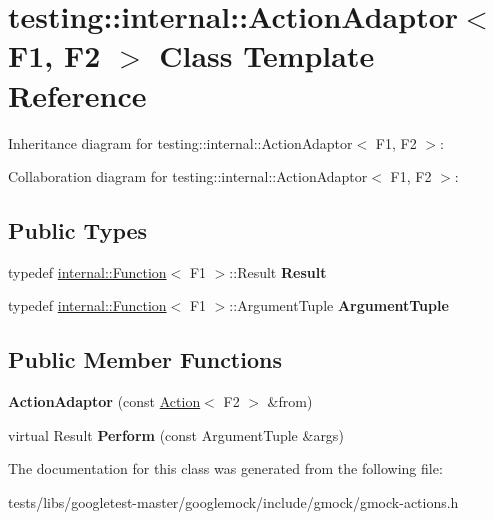 \hypertarget{classtesting_1_1internal_1_1ActionAdaptor}{}\section{testing\+:\+:internal\+:\+:Action\+Adaptor$<$ F1, F2 $>$ Class Template Reference}
\label{classtesting_1_1internal_1_1ActionAdaptor}


Inheritance diagram for testing\+:\+:internal\+:\+:Action\+Adaptor$<$ F1, F2 $>$\+:


Collaboration diagram for testing\+:\+:internal\+:\+:Action\+Adaptor$<$ F1, F2 $>$\+:
\subsection*{Public Types}
\begin{DoxyCompactItemize}
\item 
\mbox{\label{classtesting_1_1internal_1_1ActionAdaptor_afa8f7872b6db3d8f1545fd98b45b0b95}} 
typedef \hyperlink{structtesting_1_1internal_1_1Function}{internal\+::\+Function}$<$ F1 $>$\+::Result {\bfseries Result}
\item 
\mbox{\label{classtesting_1_1internal_1_1ActionAdaptor_a4f78fb73f97b72fea8a93b78a8ab5704}} 
typedef \hyperlink{structtesting_1_1internal_1_1Function}{internal\+::\+Function}$<$ F1 $>$\+::Argument\+Tuple {\bfseries Argument\+Tuple}
\end{DoxyCompactItemize}
\subsection*{Public Member Functions}
\begin{DoxyCompactItemize}
\item 
\mbox{\label{classtesting_1_1internal_1_1ActionAdaptor_a24ba3330ef3cc365b956c50ec73e4177}} 
{\bfseries Action\+Adaptor} (const \hyperlink{classtesting_1_1Action}{Action}$<$ F2 $>$ \&from)
\item 
\mbox{\label{classtesting_1_1internal_1_1ActionAdaptor_a8d8a47a31f068cf6e0c95b91605d5540}} 
virtual Result {\bfseries Perform} (const Argument\+Tuple \&args)
\end{DoxyCompactItemize}


The documentation for this class was generated from the following file\+:\begin{DoxyCompactItemize}
\item 
tests/libs/googletest-\/master/googlemock/include/gmock/gmock-\/actions.\+h\end{DoxyCompactItemize}
